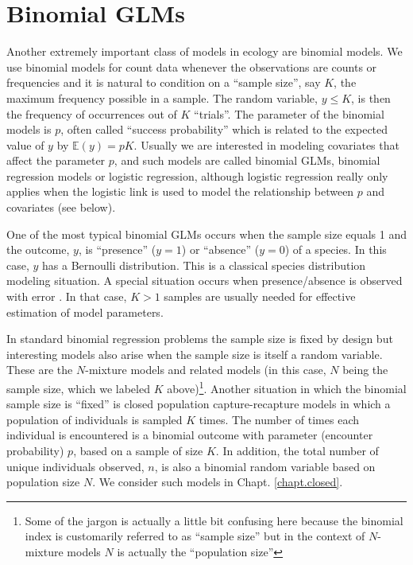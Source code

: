 



\section{Binomial GLMs}

Another extremely important class of models in ecology are
binomial models. We use binomial models for count data whenever the
observations are counts or frequencies and it is natural to condition
on a ``sample size'', say $K$, the maximum frequency possible in a sample.
 The random variable, $y \le K$, is then the
frequency of occurrences out of $K$ ``trials''. The parameter of the binomial
models is $p$, often called ``success probability'' which is related
to the expected value of $y$ by $\mathbb{E}(y) = pK$. Usually we are interested
in modeling covariates that affect the parameter $p$, and such models
are called binomial GLMs, binomial
regression models or logistic regression, although logistic regression
 really only applies when the logistic link is used to model
the relationship between $p$ and covariates (see below).

One of the most typical binomial GLMs occurs when the sample size
equals 1 and the outcome, $y$, is ``presence'' ($y=1$) or ``absence''
($y=0$) of a species. In this case, $y$ has a Bernoulli distribution. 
This is a classical species distribution
modeling situation. A special situation occurs when presence/absence
is observed with error \citep{mackenzie_etal:2002,tyre_etal:2003}.
In that case, $K>1$ samples
are usually needed for effective estimation of model parameters.

 In standard binomial regression problems the sample size
is fixed by design but interesting models also arise when the sample
size is itself a random variable. These are the $N$-mixture models
\citep{royle:2004biom, kery_etal:2005, royle_dorazio:2008, kery:2010}
and related models (in this case, $N$ being the sample size,
which we labeled $K$ above)\footnote{Some of the jargon is actually a little
bit confusing here
because the binomial index is customarily referred to as ``sample size''
but in the context of $N$-mixture models $N$ is actually the
``population size''}.
Another
situation in which the binomial sample size is ``fixed'' is closed
population capture-recapture models in which a population of
individuals is sampled $K$ times.  The number of times each individual
is encountered is a binomial outcome with parameter (encounter
probability) $p$, based on a sample of size $K$.  In addition, the
total number of unique individuals observed, $n$, is also a binomial
random variable based on population size $N$.  We consider such
models in Chapt. \ref{chapt.closed}.


